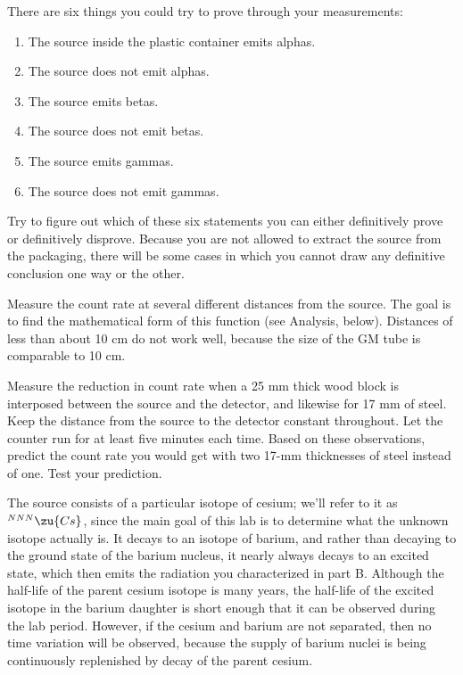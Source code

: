 There are six things you could try to prove through your measurements:
\begin{enumerate}
\item The source inside the plastic container emits alphas.
\item The source does not emit alphas.
\item The source emits betas.
\item The source does not emit betas.
\item The source emits gammas.
\item The source does not emit gammas.
\end{enumerate}

Try to figure out which of these six statements you can either definitively prove or
definitively disprove. Because you are not allowed to extract the source from the packaging,
there will be some cases in which you cannot draw any definitive conclusion one way or the other.


Measure the count rate at several different distances from the source.
The goal is to find the mathematical form of this function (see Analysis, below).
Distances of less than about 10 cm do not work well, because the size of the GM tube
is comparable to 10 cm.


Measure the reduction in count rate when a 25 mm thick wood block is 
interposed between the source and the detector, and likewise for 17 mm of steel.
Keep the distance from the source to the detector constant throughout.
Let the counter run for at least five minutes each time.
Based on these observations, predict the count rate you would
get with two 17-mm thicknesses of steel instead of one. Test your prediction.


\newcommand{\ces}{$^{NNN}\zu{Cs}$}

The source consists of a particular isotope of cesium; we'll refer to it as \ces, since the main
goal of this lab is to determine what the unknown isotope actually is. It decays to an isotope
of barium, and rather than decaying to the ground state of the barium nucleus, it nearly always
decays to an excited state, which then emits the radiation you characterized in part B.
Although the half-life of the parent cesium isotope is many years, the half-life of the
excited isotope in the barium daughter is short enough that it can be observed during the lab
period. However, if the cesium and barium are not separated, then no time variation will
be observed, because the supply of barium nuclei is being continuously replenished by
decay of the parent cesium.

